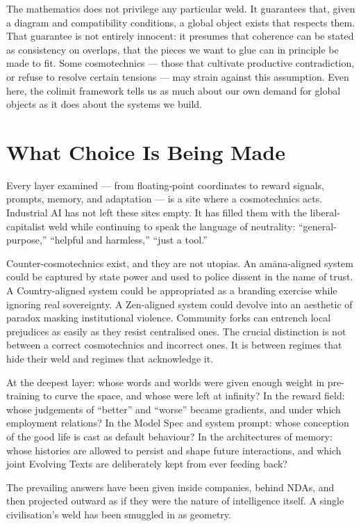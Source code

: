 \documentclass[12pt,a4paper]{article}
\begin{document}
The mathematics does not privilege any particular weld. It guarantees that, given a diagram and compatibility conditions, a global object exists that respects them. That guarantee is not entirely innocent: it presumes that coherence can be stated as consistency on overlaps, that the pieces we want to glue can in principle be made to fit. Some cosmotechnics --- those that cultivate productive contradiction, or refuse to resolve certain tensions --- may strain against this assumption. Even here, the colimit framework tells us as much about our own demand for global objects as it does about the systems we build.

\section{What Choice Is Being Made}

Every layer examined --- from floating-point coordinates to reward signals, prompts, memory, and adaptation --- is a site where a cosmotechnics acts. Industrial AI has not left these sites empty. It has filled them with the liberal-capitalist weld while continuing to speak the language of neutrality: ``general-purpose,'' ``helpful and harmless,'' ``just a tool.''

Counter-cosmotechnics exist, and they are not utopias. An am\=ana-aligned system could be captured by state power and used to police dissent in the name of trust. A Country-aligned system could be appropriated as a branding exercise while ignoring real sovereignty. A Zen-aligned system could devolve into an aesthetic of paradox masking institutional violence. Community forks can entrench local prejudices as easily as they resist centralised ones. The crucial distinction is not between a correct cosmotechnics and incorrect ones. It is between regimes that hide their weld and regimes that acknowledge it.

At the deepest layer: whose words and worlds were given enough weight in pre-training to curve the space, and whose were left at infinity? In the reward field: whose judgements of ``better'' and ``worse'' became gradients, and under which employment relations? In the Model Spec and system prompt: whose conception of the good life is cast as default behaviour? In the architectures of memory: whose histories are allowed to persist and shape future interactions, and which joint Evolving Texts are deliberately kept from ever feeding back?

The prevailing answers have been given inside companies, behind NDAs, and then projected outward as if they were the nature of intelligence itself. A single civilisation's weld has been smuggled in as geometry.
\end{document}
